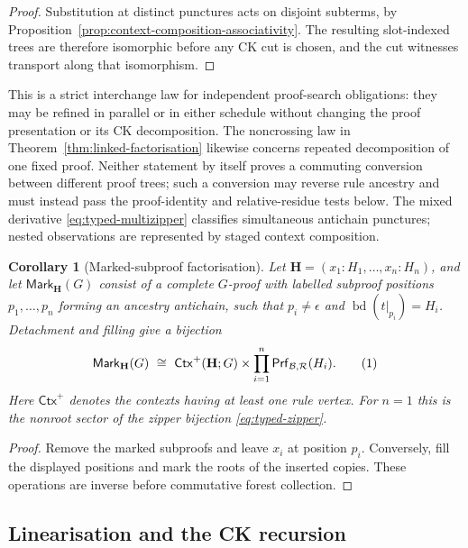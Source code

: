 \documentclass[10pt,a4paper]{article}
\theoremstyle{plain}
\newtheorem{corollary}[theorem]{Corollary}
\theoremstyle{definition}
\theoremstyle{remark}
\newcommand{\Base}{\mathcal B}
\newcommand{\Rules}{\mathcal R}
\newcommand{\rootseq}{\operatorname{bd}}
\newcommand{\Ctx}{\mathsf{Ctx}}
\newcommand{\Prf}{\mathsf{Prf}}
\newcommand{\eqtag}{\refstepcounter{equation}\tag{\theequation}}
\begin{document}
\begin{proof}
Substitution at distinct punctures acts on disjoint subterms, by
Proposition~\ref{prop:context-composition-associativity}.  The resulting
slot-indexed trees are therefore isomorphic before any CK cut is chosen,
and the cut witnesses transport along that isomorphism.
\end{proof}

This is a strict interchange law for independent proof-search obligations:
they may be refined in parallel or in either schedule without changing
the proof presentation or its CK decomposition.  The noncrossing law in
Theorem~\ref{thm:linked-factorisation} likewise concerns repeated
decomposition of one fixed proof.  Neither statement by itself proves a
commuting conversion between different proof trees; such a conversion may
reverse rule ancestry and must instead pass the proof-identity and
relative-residue tests below.  The mixed derivative
\eqref{eq:typed-multizipper} classifies simultaneous antichain punctures;
nested observations are represented by staged context composition.

\begin{corollary}[Marked-subproof factorisation]
\label{cor:profiled-factorisation}
Let \(\mathbf H=(x_1:H_1,\ldots,x_n:H_n)\), and let
\(\mathsf{Mark}_{\mathbf H}(G)\) consist of a complete \(G\)-proof with
labelled subproof positions \(p_1,\ldots,p_n\) forming an ancestry
antichain, such
that \(p_i\ne\epsilon\) and
\(\rootseq(t|_{p_i})=H_i\).  Detachment and filling give a bijection
\[
 \mathsf{Mark}_{\mathbf H}(G)
 \ \cong\
 \Ctx^+(\mathbf H;G)\times
       \prod_{i=1}^n\Prf_{\Base,\Rules}(H_i).
\eqtag\label{eq:profiled-factorisation}
\]
Here \(\Ctx^+\) denotes the contexts having at least one rule vertex.  For
\(n=1\) this is
the nonroot sector of the zipper bijection \eqref{eq:typed-zipper}.
\end{corollary}

\begin{proof}
Remove the marked subproofs and leave \(x_i\) at position \(p_i\).
Conversely, fill the displayed positions and mark the roots of the inserted
copies.  These operations are inverse before commutative forest collection.
\end{proof}

\subsection{Linearisation and the CK recursion}
\end{document}
